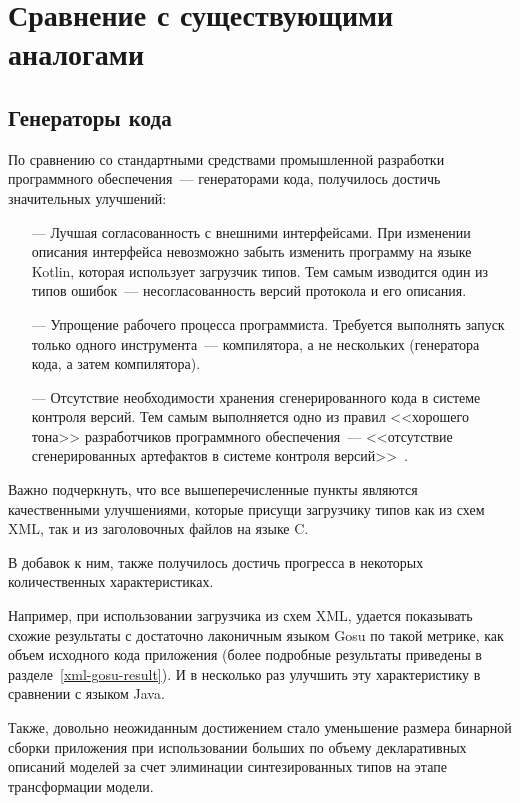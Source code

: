 \section{Сравнение с существующими аналогами}

\subsection{Генераторы кода}\label{res:generators}
По сравнению со стандартными средствами промышленной разработки программного обеспечения~--- генераторами кода,
получилось достичь значительных улучшений:
\begin{itemize}
	\item[---] Лучшая согласованность с внешними интерфейсами. При изменении описания интерфейса невозможно забыть изменить программу на языке Kotlin, которая использует загрузчик типов. Тем самым изводится один из типов ошибок~--- несогласованность версий протокола и его описания.
	\item[---] Упрощение рабочего процесса программиста. Требуется выполнять запуск только одного инструмента~--- компилятора, а не нескольких (генератора кода, а затем компилятора).
	\item[---] Отсутствие необходимости хранения сгенерированного кода в системе контроля версий. Тем самым выполняется одно из правил <<хорошего тона>> разработчиков программного обеспечения~--- <<отсутствие сгенерированных артефактов в системе контроля версий>>~\cite{art-of-agile}.
\end{itemize}

Важно подчеркнуть, что все вышеперечисленные пункты являются качественными улучшениями, которые присущи загрузчику типов как из схем XML, так и из заголовочных файлов на языке C.

В добавок к ним, также получилось достичь прогресса в некоторых количественных характеристиках.

Например, при использовании загрузчика из схем XML, удается показывать схожие результаты с достаточно лаконичным языком Gosu по такой метрике, как объем исходного кода приложения
(более подробные результаты приведены в разделе~\ref{xml-gosu-result}).
И в несколько раз улучшить эту характеристику в сравнении с языком Java.

Также, довольно неожиданным достижением стало уменьшение размера бинарной сборки приложения при использовании больших по объему декларативных описаний моделей за счет элиминации синтезированных типов на этапе трансформации модели.

